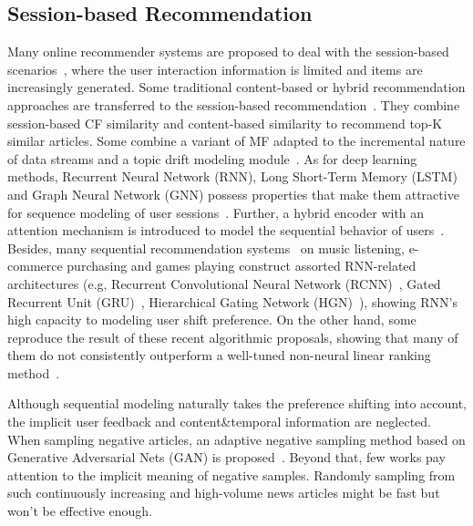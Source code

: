 \subsection{Session-based Recommendation}
Many online recommender systems are proposed to deal with the session-based scenarios~\cite{epure_recommending_2017,zhou_variational_2019}, where the user interaction information is limited and items are increasingly generated. Some traditional content-based or hybrid recommendation approaches are transferred to the session-based recommendation~\cite{sottocornola2018session}.  They combine session-based CF similarity and content-based similarity to recommend top-K similar articles. Some combine a variant of MF adapted to the incremental nature of data streams and a topic drift modeling module~\cite{al2018adaptive}. As for deep learning methods, Recurrent Neural Network (RNN), Long Short-Term Memory (LSTM) and Graph Neural Network (GNN) possess properties that make them attractive for sequence modeling of user sessions~\cite{guo_streaming_2019,hidasi2015session,wang2019modeling,moreira_news_2018,wu2019session}. Further, a hybrid encoder with an attention mechanism is introduced to model the sequential behavior of users~\cite{li2017neural,liu2018stamp,xu2019time,song_islf_2019,zhang_feature-level_2019}. 
Besides, many sequential recommendation systems~\cite{pereira2019online,xu2019graph} on music listening, e-commerce purchasing and games playing construct assorted RNN-related architectures (e.g, Recurrent Convolutional Neural Network (RCNN)~\cite{xu_recurrent_2019}, Gated Recurrent Unit (GRU)~\cite{hidasi2018recurrent}, Hierarchical Gating Network (HGN)~\cite{xiao2019hierarchical,ma2019hierarchical}), showing RNN's high capacity to modeling user shift preference. On the other hand, some reproduce the result of these recent algorithmic proposals, showing that many of them do not consistently outperform a well-tuned non-neural linear ranking method~\cite{dacrema_are_2019,ludewig_performance_2019}.

Although sequential modeling naturally takes the preference shifting into account, the implicit user feedback and content\&temporal information are neglected. When sampling negative articles, an adaptive negative sampling method based on Generative Adversarial Nets (GAN) is proposed~\cite{wang_neural_2018}. Beyond that, few works pay attention to the implicit meaning of negative samples. Randomly sampling from such continuously increasing and high-volume news articles might be fast but won't be effective enough.

